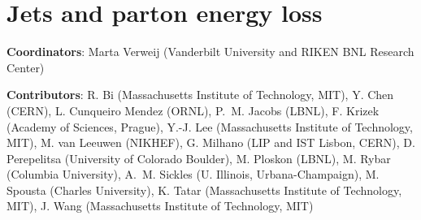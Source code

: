 \documentclass[../report.tex]{subfiles}
\providecommand{\main}{..}
\begin{document}
\section{Jets and parton energy loss}\label{sec:HI_Jets}

{ \small
  \noindent \textbf{Coordinators}: Marta Verweij (Vanderbilt University and RIKEN BNL Research Center)
  
  \noindent \textbf{Contributors}:
R. Bi (Massachusetts Institute of Technology, MIT),
Y. Chen (CERN),
L. Cunqueiro Mendez (ORNL),
P.~M. Jacobs (LBNL),
F. Krizek (Academy of Sciences, Prague),
Y.-J. Lee (Massachusetts Institute of Technology, MIT),
M. van Leeuwen (NIKHEF),
G. Milhano (LIP and IST Lisbon, CERN),
D. Perepelitsa (University of Colorado Boulder),
M. Ploskon (LBNL),
M. Rybar (Columbia University),
A.~M. Sickles (U. Illinois, Urbana-Champaign),
M. Spousta (Charles University),
K. Tatar (Massachusetts Institute of Technology, MIT),
J. Wang  (Massachusetts Institute of Technology, MIT)
}



\newpage

\newpage

\newpage


\end{document}
